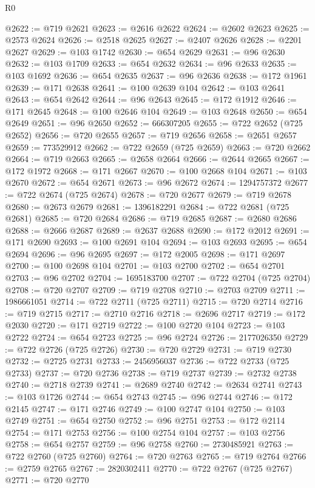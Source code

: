 \begin{lexlean}{R0}
\begin{coremodule}
@2622 := @719 @2621
@2623 := @2616 @2622
@2624 := @2602 @2623
@2625 := @2573 @2624
@2626 := @2518 @2625
@2627 := @2407 @2626
@2628 := @2201 @2627
@2629 := @103 @1742
@2630 := @654 @2629
@2631 := @96 @2630
@2632 := @103 @1709
@2633 := @654 @2632
@2634 := @96 @2633
@2635 := @103 @1692
@2636 := @654 @2635
@2637 := @96 @2636
@2638 := @172 @1961
@2639 := @171 @2638
@2641 := @100 @2639 @104
@2642 := @103 @2641
@2643 := @654 @2642
@2644 := @96 @2643
@2645 := @172 @1912
@2646 := @171 @2645
@2648 := @100 @2646 @104
@2649 := @103 @2648
@2650 := @654 @2649
@2651 := @96 @2650
@2652 := 666307205
@2655 := @722 @2652 (@725 @2652)
@2656 := @720 @2655
@2657 := @719 @2656
@2658 := @2651 @2657
@2659 := 773529912
@2662 := @722 @2659 (@725 @2659)
@2663 := @720 @2662
@2664 := @719 @2663
@2665 := @2658 @2664
@2666 := @2644 @2665
@2667 := @172 @1972
@2668 := @171 @2667
@2670 := @100 @2668 @104
@2671 := @103 @2670
@2672 := @654 @2671
@2673 := @96 @2672
@2674 := 1294757372
@2677 := @722 @2674 (@725 @2674)
@2678 := @720 @2677
@2679 := @719 @2678
@2680 := @2673 @2679
@2681 := 1396182291
@2684 := @722 @2681 (@725 @2681)
@2685 := @720 @2684
@2686 := @719 @2685
@2687 := @2680 @2686
@2688 := @2666 @2687
@2689 := @2637 @2688
@2690 := @172 @2012
@2691 := @171 @2690
@2693 := @100 @2691 @104
@2694 := @103 @2693
@2695 := @654 @2694
@2696 := @96 @2695
@2697 := @172 @2005
@2698 := @171 @2697
@2700 := @100 @2698 @104
@2701 := @103 @2700
@2702 := @654 @2701
@2703 := @96 @2702
@2704 := 1695183700
@2707 := @722 @2704 (@725 @2704)
@2708 := @720 @2707
@2709 := @719 @2708
@2710 := @2703 @2709
@2711 := 1986661051
@2714 := @722 @2711 (@725 @2711)
@2715 := @720 @2714
@2716 := @719 @2715
@2717 := @2710 @2716
@2718 := @2696 @2717
@2719 := @172 @2030
@2720 := @171 @2719
@2722 := @100 @2720 @104
@2723 := @103 @2722
@2724 := @654 @2723
@2725 := @96 @2724
@2726 := 2177026350
@2729 := @722 @2726 (@725 @2726)
@2730 := @720 @2729
@2731 := @719 @2730
@2732 := @2725 @2731
@2733 := 2456956037
@2736 := @722 @2733 (@725 @2733)
@2737 := @720 @2736
@2738 := @719 @2737
@2739 := @2732 @2738
@2740 := @2718 @2739
@2741 := @2689 @2740
@2742 := @2634 @2741
@2743 := @103 @1726
@2744 := @654 @2743
@2745 := @96 @2744
@2746 := @172 @2145
@2747 := @171 @2746
@2749 := @100 @2747 @104
@2750 := @103 @2749
@2751 := @654 @2750
@2752 := @96 @2751
@2753 := @172 @2114
@2754 := @171 @2753
@2756 := @100 @2754 @104
@2757 := @103 @2756
@2758 := @654 @2757
@2759 := @96 @2758
@2760 := 2730485921
@2763 := @722 @2760 (@725 @2760)
@2764 := @720 @2763
@2765 := @719 @2764
@2766 := @2759 @2765
@2767 := 2820302411
@2770 := @722 @2767 (@725 @2767)
@2771 := @720 @2770

\end{coremodule}
\end{lexlean}
